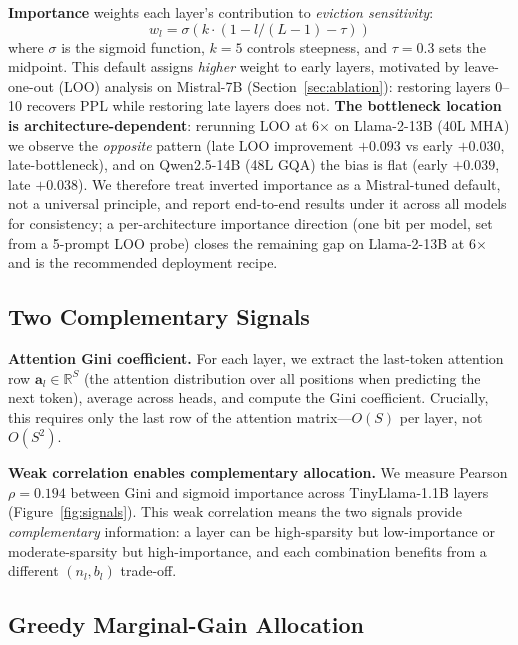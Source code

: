 \documentclass{article}
\newcommand{\nlayers}{L}
\begin{document}
\textbf{Importance} weights each layer's contribution to \emph{eviction sensitivity}:
\begin{equation}
w_l = \sigma(k \cdot (1 - l/(\nlayers-1) - \tau))
\label{eq:importance}
\end{equation}
where $\sigma$ is the sigmoid function, $k=5$ controls steepness, and $\tau=0.3$ sets the midpoint.
This default assigns \emph{higher} weight to early layers, motivated by leave-one-out (LOO) analysis on Mistral-7B (Section~\ref{sec:ablation}): restoring layers 0--10 recovers PPL while restoring late layers does not.
\textbf{The bottleneck location is architecture-dependent}: rerunning LOO at 6$\times$ on Llama-2-13B (40L MHA) we observe the \emph{opposite} pattern (late LOO improvement $+0.093$ vs early $+0.030$, late-bottleneck), and on Qwen2.5-14B (48L GQA) the bias is flat (early $+0.039$, late $+0.038$).
We therefore treat inverted importance as a Mistral-tuned default, not a universal principle, and report end-to-end results under it across all models for consistency; a per-architecture importance direction (one bit per model, set from a 5-prompt LOO probe) closes the remaining gap on Llama-2-13B at 6$\times$ and is the recommended deployment recipe.

\subsection{Two Complementary Signals}

\textbf{Attention Gini coefficient.}
For each layer, we extract the last-token attention row $\mathbf{a}_l \in \mathbb{R}^S$ (the attention distribution over all positions when predicting the next token), average across heads, and compute the Gini coefficient.
Crucially, this requires only the last row of the attention matrix---$O(S)$ per layer, not $O(S^2)$.

\textbf{Weak correlation enables complementary allocation.}
We measure Pearson $\rho = 0.194$ between Gini and sigmoid importance across TinyLlama-1.1B layers (Figure~\ref{fig:signals}).
This weak correlation means the two signals provide \emph{complementary} information: a layer can be high-sparsity but low-importance or moderate-sparsity but high-importance, and each combination benefits from a different $(n_l, b_l)$ trade-off.

\subsection{Greedy Marginal-Gain Allocation}
\label{sec:algorithm}
\end{document}
